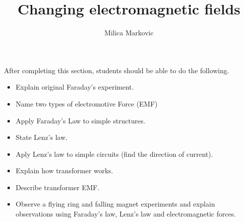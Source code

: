 \documentclass{ximera}
\title{Changing electromagnetic fields}
\author{Milica Markovic}
\begin{document}
\begin{abstract}
\end{abstract}

\maketitle

\begin{sectionOutcomes}

After completing this section, students should be able to do the following.

\begin{itemize}
\item Explain original Faraday's experiment.
\item Name two types of electromotive Force (EMF)
\item Apply Faraday's Law to simple structures.
\item State Lenz's law.
\item Aply Lenz's law to simple circuits (find the direction of current).
\item Explain how transformer works.
\item Describe transformer EMF.
\item Observe a flying ring and falling magnet experiments and explain observations using Faraday's law, Lenz's law and electromagnetic forces.
\end{itemize}

\end{sectionOutcomes}
\end{document}
